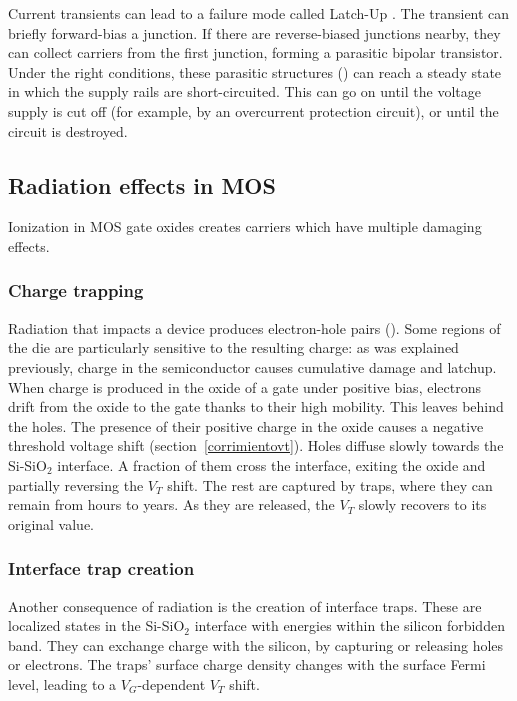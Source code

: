 Current transients can lead to a failure mode called Latch-Up
\cite{gregory_latch-up_1973}.
The transient can briefly forward-bias a junction.
If there are reverse-biased junctions nearby,
they can collect carriers from the first junction,
forming a parasitic bipolar transistor.
Under the right conditions,
these parasitic structures ()
can reach a steady state in which
the supply rails are short-circuited.
This can go on until the voltage supply is cut off
(for example, by an overcurrent protection circuit),
or until the circuit is destroyed.
\subsection{Radiation effects in MOS}
Ionization in MOS gate oxides creates carriers which
have multiple damaging effects. 
\subsubsection{Charge trapping}
Radiation that impacts a device produces electron-hole pairs ().
Some regions of the die are particularly sensitive to the resulting charge:
as was explained previously,
charge in the semiconductor causes cumulative damage and latchup.
When charge is produced in the oxide of a gate under positive bias,
electrons drift from the oxide to the gate thanks to their high mobility.
This leaves behind the holes.
The presence of their positive charge in the oxide causes a negative threshold voltage shift
(section~\ref{corrimientovt}).
Holes diffuse slowly towards the Si-SiO$_2$ interface.
A fraction of them cross the interface,
exiting the oxide and partially reversing the $V_T$ shift.
The rest are captured by traps,
where they can remain from hours to years.
As they are released,
the $V_T$ slowly recovers to its original value.
\subsubsection{Interface trap creation}
Another consequence of radiation is the creation of interface traps.
These are localized states in the Si-SiO$_2$ interface
with energies within the silicon forbidden band.
They can exchange charge with the silicon,
by capturing or releasing holes or electrons.
The traps' surface charge density changes with the surface Fermi level,
leading to a $V_G$-dependent $V_T$ shift.
